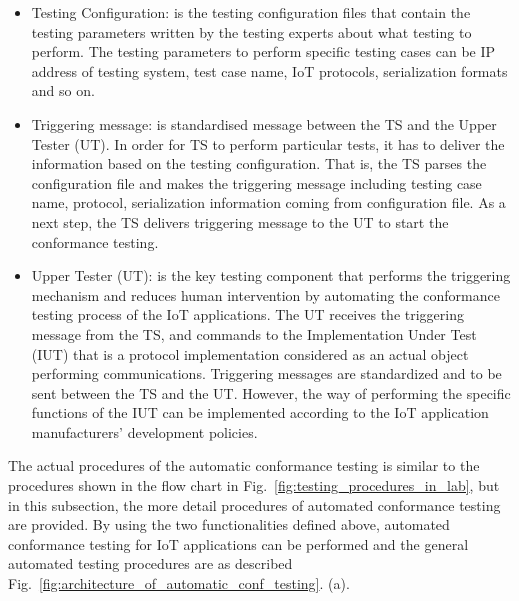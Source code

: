 \begin{itemize}
    \item Testing Configuration: is the testing configuration files that contain the testing parameters written by the testing experts about what testing to perform. The testing parameters to perform specific testing cases can be IP address of testing system, test case name, IoT protocols, serialization formats and so on.
    
    \item Triggering message: is standardised message between the TS and the Upper Tester (UT). In order for TS to perform particular tests, it has to deliver the information based on the testing configuration. That is, the TS parses the configuration file and makes the triggering message including testing case name, protocol, serialization information coming from configuration file. As a next step, the TS delivers triggering message to the UT to start the conformance testing.
    
    \item Upper Tester (UT): is the key testing component that performs the triggering mechanism and reduces human intervention by automating the conformance testing process of the IoT applications. The UT receives the triggering message from the TS, and commands to the Implementation Under Test (IUT) that is a protocol implementation considered as an actual object performing communications. Triggering messages are standardized and to be sent between the TS and the UT. However, the way of performing the specific functions of the IUT can be implemented according to the IoT application manufacturers’ development policies. 
\end{itemize}

The actual procedures of the automatic conformance testing is similar to the procedures shown in the flow chart in Fig.~\ref{fig:testing_procedures_in_lab}, but in this subsection, the more detail procedures of automated conformance testing are provided. By using the two functionalities defined above, automated conformance testing for IoT applications can be performed and the general automated testing procedures are as described Fig.~\ref{fig:architecture_of_automatic_conf_testing}. (a).

